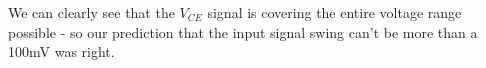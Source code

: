 We can clearly see that the $V_{CE}$ signal is covering the entire voltage range possible - so our prediction that the input signal swing can't be more than a 100mV was right.

%
%
%
%
%
%
%






